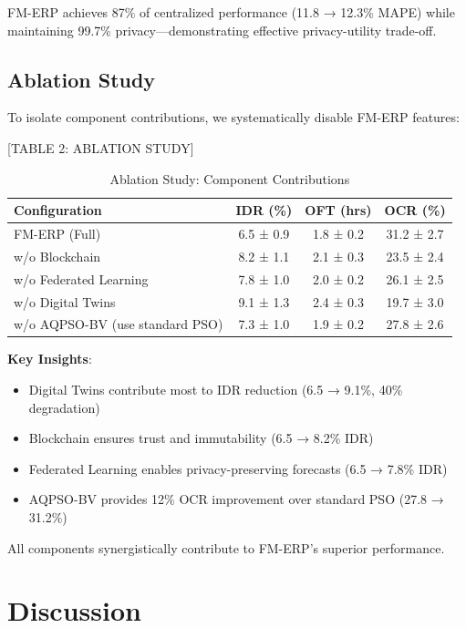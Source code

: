 \documentclass[times,10pt,twocolumn]{jucs2e}
\begin{document}
FM-ERP achieves 87\% of centralized performance (11.8 → 12.3\% MAPE) while maintaining 99.7\% privacy—demonstrating effective privacy-utility trade-off.

\subsection{Ablation Study}

To isolate component contributions, we systematically disable FM-ERP features:

[TABLE 2: ABLATION STUDY]
\begin{table}[h!]
\centering
\caption{Ablation Study: Component Contributions}
\begin{tabular}{lccc}
\toprule
\textbf{Configuration} & \textbf{IDR (\%)} & \textbf{OFT (hrs)} & \textbf{OCR (\%)} \\
\midrule
FM-ERP (Full) & 6.5 ± 0.9 & 1.8 ± 0.2 & 31.2 ± 2.7 \\
\midrule
w/o Blockchain & 8.2 ± 1.1 & 2.1 ± 0.3 & 23.5 ± 2.4 \\
w/o Federated Learning & 7.8 ± 1.0 & 2.0 ± 0.2 & 26.1 ± 2.5 \\
w/o Digital Twins & 9.1 ± 1.3 & 2.4 ± 0.3 & 19.7 ± 3.0 \\
w/o AQPSO-BV (use standard PSO) & 7.3 ± 1.0 & 1.9 ± 0.2 & 27.8 ± 2.6 \\
\bottomrule
\end{tabular}
\end{table}

\textbf{Key Insights}:
\begin{itemize}
\item Digital Twins contribute most to IDR reduction (6.5 → 9.1\%, 40\% degradation)
\item Blockchain ensures trust and immutability (6.5 → 8.2\% IDR)
\item Federated Learning enables privacy-preserving forecasts (6.5 → 7.8\% IDR)
\item AQPSO-BV provides 12\% OCR improvement over standard PSO (27.8 → 31.2\%)
\end{itemize}

All components synergistically contribute to FM-ERP's superior performance.


\section{Discussion}
\end{document}
